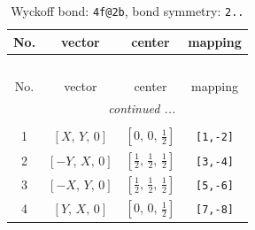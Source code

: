 \documentclass[fleqn,8pt]{jsarticle}
\begin{document}
\renewcommand{\arraystretch}{1.2}
\begin{longtable}{cccc}
\caption{Wyckoff bond: {\tt 4f@2b}, bond symmetry: {\tt 2..}}
 \\
 \hline \hline
No. & vector & center & mapping \\ \hline \endfirsthead

\multicolumn{3}{l}{\tablename\ \thetable{}} \\
 \hline \hline
No. & vector & center & mapping \\ \hline \endhead

 \hline \hline
\multicolumn{3}{r}{\footnotesize\it continued ...} \\ \endfoot

 \hline \hline
\multicolumn{3}{r}{} \\ \endlastfoot

1 & $\left[ X,\, Y,\, 0 \right]$ & $\left[ 0,\, 0,\, \frac{1}{2} \right]$ & {\tt [1,-2]} \\ \hline
2 & $\left[ - Y,\, X,\, 0 \right]$ & $\left[ \frac{1}{2},\, \frac{1}{2},\, \frac{1}{2} \right]$ & {\tt [3,-4]} \\ \hline
3 & $\left[ - X,\, Y,\, 0 \right]$ & $\left[ \frac{1}{2},\, \frac{1}{2},\, \frac{1}{2} \right]$ & {\tt [5,-6]} \\ \hline
4 & $\left[ Y,\, X,\, 0 \right]$ & $\left[ 0,\, 0,\, \frac{1}{2} \right]$ & {\tt [7,-8]} \\
\end{longtable}
\renewcommand{\arraystretch}{1.2}
\end{document}
